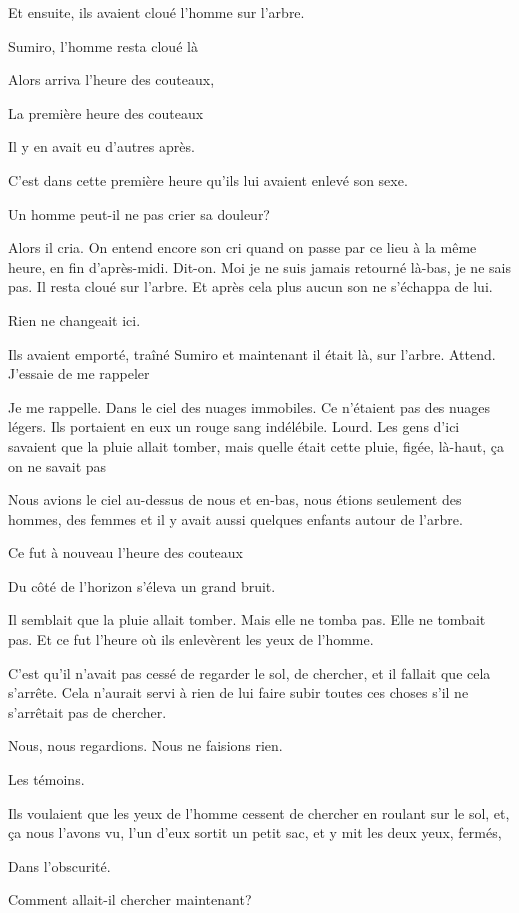 Et ensuite, ils avaient cloué l'homme sur l'arbre.

Sumiro, l'homme resta cloué là

Alors arriva l'heure des couteaux,

La première heure des couteaux

Il y en avait eu d'autres après.

C'est dans cette première heure qu'ils lui avaient enlevé son sexe.

Un homme peut-il ne pas crier sa douleur?

Alors il cria. On entend encore son cri quand on passe par ce lieu à la
même heure, en fin d'après-midi. Dit-on. Moi je ne suis jamais retourné
là-bas, je ne sais pas. Il resta cloué sur l'arbre. Et après cela plus
aucun son ne s'échappa de lui.

Rien ne changeait ici.

Ils avaient emporté, traîné Sumiro et maintenant il était là, sur
l'arbre. Attend. J'essaie de me rappeler

Je me rappelle. Dans le ciel des nuages immobiles. Ce n'étaient pas des
nuages légers. Ils portaient en eux un rouge sang indélébile. Lourd. Les
gens d'ici savaient que la pluie allait tomber, mais quelle était cette
pluie, figée, là-haut, ça on ne savait pas

Nous avions le ciel au-dessus de nous et en-bas, nous étions seulement
des hommes, des femmes et il y avait aussi quelques enfants autour de
l'arbre.

Ce fut à nouveau l'heure des couteaux

Du côté de l'horizon s'éleva un grand bruit.

Il semblait que la pluie allait tomber. Mais elle ne tomba pas. Elle ne
tombait pas. Et ce fut l'heure où ils enlevèrent les yeux de l'homme.

C'est qu'il n'avait pas cessé de regarder le sol, de chercher, et il
fallait que cela s'arrête. Cela n'aurait servi à rien de lui faire subir
toutes ces choses s'il ne s'arrêtait pas de chercher.

Nous, nous regardions. Nous ne faisions rien.

Les témoins.

Ils voulaient que les yeux de l'homme cessent de chercher en roulant sur
le sol, et, ça nous l'avons vu, l'un d'eux sortit un petit sac, et y mit
les deux yeux, fermés,

Dans l'obscurité.

Comment allait-il chercher maintenant?

